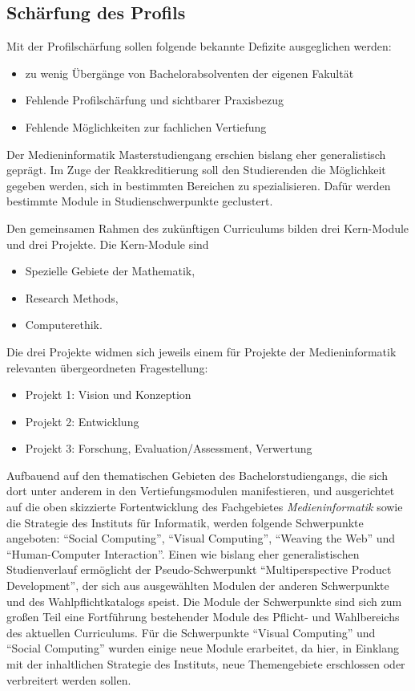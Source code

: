 \subsection{Schärfung des Profils}\label{schuxe4rfung-des-profils}

Mit der Profilschärfung sollen folgende bekannte Defizite ausgeglichen
werden:

\begin{itemize}
\tightlist
\item
  zu wenig Übergänge von Bachelorabsolventen der eigenen Fakultät
\item
  Fehlende Profilschärfung und sichtbarer Praxisbezug
\item
  Fehlende Möglichkeiten zur fachlichen Vertiefung
\end{itemize}

Der Medieninformatik Masterstudiengang erschien bislang eher
generalistisch geprägt. Im Zuge der Reakkreditierung soll den
Studierenden die Möglichkeit gegeben werden, sich in bestimmten
Bereichen zu spezialisieren. Dafür werden bestimmte Module in
Studienschwerpunkte geclustert.

Den gemeinsamen Rahmen des zukünftigen Curriculums bilden drei
Kern-Module und drei Projekte. Die Kern-Module sind

\begin{itemize}
\tightlist
\item
  Spezielle Gebiete der Mathematik,
\item
  Research Methods,
\item
  Computerethik.
\end{itemize}

Die drei Projekte widmen sich jeweils einem für Projekte der
Medieninformatik relevanten übergeordneten Fragestellung:

\begin{itemize}
\tightlist
\item
  Projekt 1: Vision und Konzeption
\item
  Projekt 2: Entwicklung
\item
  Projekt 3: Forschung, Evaluation/Assessment, Verwertung
\end{itemize}

Aufbauend auf den thematischen Gebieten des Bachelorstudiengangs, die
sich dort unter anderem in den Vertiefungsmodulen manifestieren, und
ausgerichtet auf die oben skizzierte Fortentwicklung des Fachgebietes
\emph{Medieninformatik} sowie die Strategie des Instituts für
Informatik, werden folgende Schwerpunkte angeboten: ``Social
Computing'', ``Visual Computing'', ``Weaving the Web'' und
``Human-Computer Interaction''. Einen wie bislang eher generalistischen
Studienverlauf ermöglicht der Pseudo-Schwerpunkt ``Multiperspective
Product Development'', der sich aus ausgewählten Modulen der anderen
Schwerpunkte und des Wahlpflichtkatalogs speist. Die Module der
Schwerpunkte sind sich zum großen Teil eine Fortführung bestehender
Module des Pflicht- und Wahlbereichs des aktuellen Curriculums. Für die
Schwerpunkte ``Visual Computing'' und ``Social Computing'' wurden einige
neue Module erarbeitet, da hier, in Einklang mit der inhaltlichen
Strategie des Instituts, neue Themengebiete erschlossen oder verbreitert
werden sollen.

